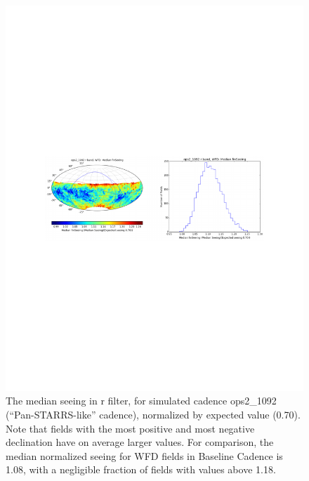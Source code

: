 \begin{figure}[t!]
\vskip -3.9in
\hskip -0.5in
\includegraphics[angle=0,width=1.19\hsize:,clip]{figs/PS-seeing.pdf}
\vskip -4.0in
\caption{The median seeing in r filter, for simulated cadence ops2\_1092 (``Pan-STARRS-like'' cadence),
normalized by expected value (0.70). Note that fields with the most positive and most negative
declination have on average larger values. For comparison, the median normalized seeing for WFD fields
in Baseline Cadence is 1.08, with a negligible fraction of fields with values above 1.18.}
\label{fig:PS-seeing}
\end{figure}




